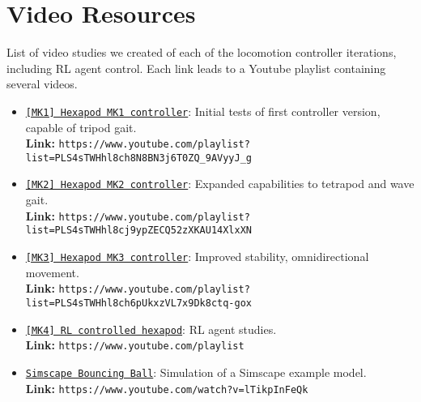 \chapter*{Video Resources}

List of video studies we created of each of the locomotion controller iterations, including RL agent control.
Each link leads to a Youtube playlist containing several videos.

\begin{itemize} 
	\item \href{https://www.youtube.com/playlist?list=PLS4sTWHhl8ch8N8BN3j6T0ZQ_9AVyyJ_g}{\texttt{[MK1] Hexapod MK1 controller}}: Initial tests of first controller version, capable of tripod gait. \\
																						  \textbf{Link:} \nolinkurl{https://www.youtube.com/playlist?list=PLS4sTWHhl8ch8N8BN3j6T0ZQ_9AVyyJ_g} \label{vid: MK1}
	
	\item \href{https://www.youtube.com/playlist?list=PLS4sTWHhl8cj9ypZECQ52zXKAU14XlxXN}{\texttt{[MK2] Hexapod MK2 controller}}: Expanded capabilities to tetrapod and wave gait. \\
																						  \textbf{Link:} \nolinkurl{https://www.youtube.com/playlist?list=PLS4sTWHhl8cj9ypZECQ52zXKAU14XlxXN} \label{vid: MK2}
	
	\item \href{https://www.youtube.com/playlist?list=PLS4sTWHhl8ch6pUkxzVL7x9Dk8ctq-gox}{\texttt{[MK3] Hexapod MK3 controller}}: Improved stability, omnidirectional movement. \\
																						  \textbf{Link:} \nolinkurl{https://www.youtube.com/playlist?list=PLS4sTWHhl8ch6pUkxzVL7x9Dk8ctq-gox} \label{vid: MK3}
	
	\item \href{}{\texttt{[MK4] RL controlled hexapod}}: RL agent studies. \\
	\textbf{Link:} \nolinkurl{https://www.youtube.com/playlist} \label{vid: MK4}
	
	
	\item \href{https://www.youtube.com/watch?v=lTikpInFeQk}{\texttt{Simscape Bouncing Ball}}: Simulation of a Simscape example model. \\
															 \textbf{Link:} \nolinkurl{https://www.youtube.com/watch?v=lTikpInFeQk} \label{vid: Simscape}
\end{itemize}
